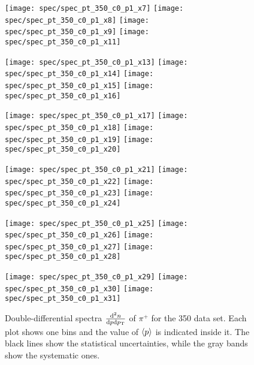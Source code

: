 \begin{figure}[!ht]
  \centering

  \texttt{[image: spec/spec\_pt\_350\_c0\_p1\_x7]}
  \texttt{[image: spec/spec\_pt\_350\_c0\_p1\_x8]}
  \texttt{[image: spec/spec\_pt\_350\_c0\_p1\_x9]}
  \texttt{[image: spec/spec\_pt\_350\_c0\_p1\_x11]}

  \texttt{[image: spec/spec\_pt\_350\_c0\_p1\_x13]}
  \texttt{[image: spec/spec\_pt\_350\_c0\_p1\_x14]}
  \texttt{[image: spec/spec\_pt\_350\_c0\_p1\_x15]}
  \texttt{[image: spec/spec\_pt\_350\_c0\_p1\_x16]}

  \texttt{[image: spec/spec\_pt\_350\_c0\_p1\_x17]}
  \texttt{[image: spec/spec\_pt\_350\_c0\_p1\_x18]}
  \texttt{[image: spec/spec\_pt\_350\_c0\_p1\_x19]}
  \texttt{[image: spec/spec\_pt\_350\_c0\_p1\_x20]}

  \texttt{[image: spec/spec\_pt\_350\_c0\_p1\_x21]}
  \texttt{[image: spec/spec\_pt\_350\_c0\_p1\_x22]}
  \texttt{[image: spec/spec\_pt\_350\_c0\_p1\_x23]}
  \texttt{[image: spec/spec\_pt\_350\_c0\_p1\_x24]}

  \texttt{[image: spec/spec\_pt\_350\_c0\_p1\_x25]}
  \texttt{[image: spec/spec\_pt\_350\_c0\_p1\_x26]}
  \texttt{[image: spec/spec\_pt\_350\_c0\_p1\_x27]}
  \texttt{[image: spec/spec\_pt\_350\_c0\_p1\_x28]}

  \texttt{[image: spec/spec\_pt\_350\_c0\_p1\_x29]}
  \texttt{[image: spec/spec\_pt\_350\_c0\_p1\_x30]}
  \texttt{[image: spec/spec\_pt\_350\_c0\_p1\_x31]}

  \caption{Double-differential spectra $\frac{\text{d}^2n}{\text{d}p\text{d}p_\text{T}}$
    of $\pi^+$ for the 350 \GeVc data set. Each plot shows one \pp bins and the value
    of $\langle p\rangle$ is indicated inside it. The black lines show the statistical
    uncertainties, while the gray bands show the systematic ones.}
  \label{fig:hadron:spec:dedx:all350:c0p1}
\end{figure}



